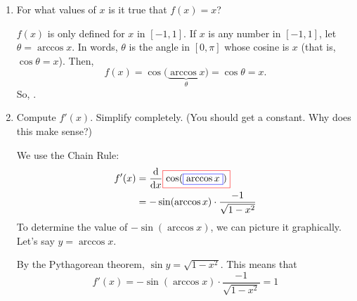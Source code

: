 \documentclass[main]{subfiles}
\begin{document}
\begin{enumerate}[resume]
\begin{enumerate}
  \item
    \begin{problem}[1in]
      For what values of $x$ is it true that $f(x) = x$?
    \end{problem}

    \begin{solution}
      $f(x)$ is only defined for $x$ in $[-1, 1]$.  If $x$ is any number
      in $[-1, 1]$, let $\theta = \arccos x$.  In words, $\theta$ is the
      angle in $[0, \pi]$ whose cosine is $x$ (that is, $\cos \theta =
      x$).  Then, \[f(x) = \cos \Big( \underbrace{\arccos x}_\theta \Big)
      = \cos \theta = x.\] So, .
    \end{solution}

  \item
    \begin{problem}[\vfill]
      Compute $f'(x)$. Simplify completely. (You should get a constant. 
      Why does this make sense?)
    \end{problem}

    \begin{solution}
        We use the Chain Rule:
        \begin{align*}
        f'(x) &= \diff*{\outside{$\cos(\inside{$\arccos x$})$}}{x} \\
        &= -\sin(\arccos x) \cdot \frac{-1}{\sqrt{1-x^2}}
        \end{align*}
        To determine the value of $-\sin(\arccos x)$, we can picture it
        graphically. Let's say $y=\arccos x$.
    \begin{center}
    \end{center}
    By the Pythagorean theorem, $\sin y = \sqrt{1-x^2}$. This means that
    \[f'(x)=-\sin(\arccos x) \cdot \frac{-1}{\sqrt{1-x^2}}=\boxed{1}\]
    

\end{solution}
\end{enumerate}
\end{enumerate}
\end{document}
